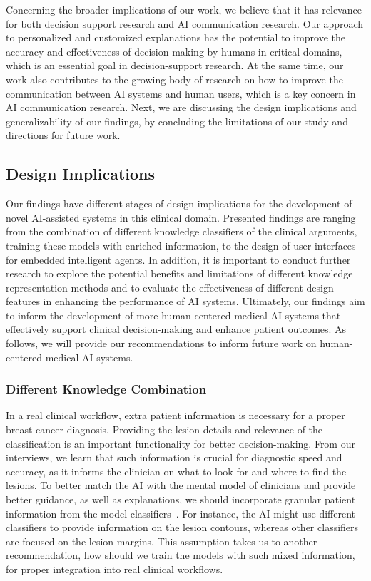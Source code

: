 Concerning the broader implications of our work, we believe that it has relevance for both decision support research and AI communication research.
Our approach to personalized and customized explanations has the potential to improve the accuracy and effectiveness of decision-making by humans in critical domains, which is an essential goal in decision-support research.
At the same time, our work also contributes to the growing body of research on how to improve the communication between AI systems and human users, which is a key concern in AI communication research.
Next, we are discussing the design implications and generalizability of our findings, by concluding the limitations of our study and directions for future work.

\subsection{Design Implications}
\label{sec:chap006007001}

Our findings have different stages of design implications for the development of novel AI-assisted systems in this clinical domain.
Presented findings are ranging from the combination of different knowledge classifiers of the clinical arguments, training these models with enriched information, to the design of user interfaces for embedded intelligent agents.
In addition, it is important to conduct further research to explore the potential benefits and limitations of different knowledge representation methods and to evaluate the effectiveness of different design features in enhancing the performance of AI systems.
Ultimately, our findings aim to inform the development of more human-centered medical AI systems that effectively support clinical decision-making and enhance patient outcomes.
As follows, we will provide our recommendations to inform future work on human-centered medical AI systems.

\subsubsection{Different Knowledge Combination}
\label{sec:chap006007001001}

In a real clinical workflow, extra patient information is necessary for a proper breast cancer diagnosis.
Providing the lesion details and relevance of the classification is an important functionality for better decision-making.
From our interviews, we learn that such information is crucial for diagnostic speed and accuracy, as it informs the clinician on what to look for and where to find the lesions.
To better match the AI with the mental model of clinicians and provide better guidance, as well as explanations, we should incorporate granular patient information from the model classifiers~\cite{doi:10.1148/ryai.210299}.
For instance, the AI might use different classifiers to provide information on the lesion contours, whereas other classifiers are focused on the lesion margins.
This assumption takes us to another recommendation, how should we train the models with such mixed information, for proper integration into real clinical workflows.

